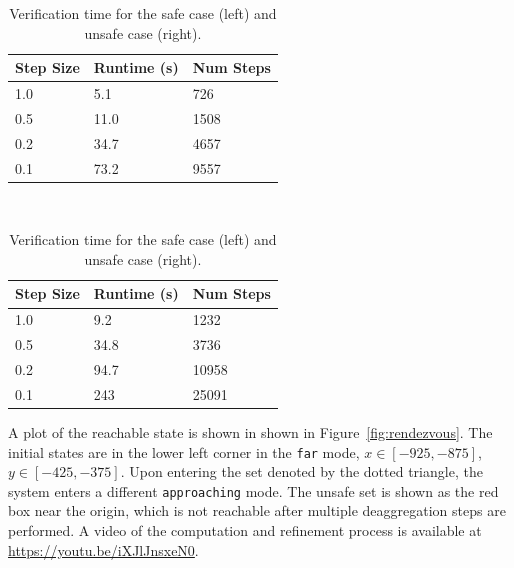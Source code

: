 \setlength{\tabcolsep}{2pt}
\begin{table}[t]
\caption{Verification time for the safe case (left) and unsafe case (right).}
\label{tab:runtime}
\centering
\setlength{\aboverulesep}{0.0pt}
\setlength{\belowrulesep}{0.0pt}
\setlength{\extrarowheight}{.0ex}
\begin{tabular}{@{}lll@{}}
  \toprule
  Step Size & Runtime (s) & Num Steps \\
  \midrule
  1.0 & 5.1 & 726 \\
  0.5 & 11.0 & 1508 \\
  0.2 & 34.7 & 4657 \\
  0.1 & 73.2 & 9557 \\
\bottomrule
\end{tabular}
~~~~~~~~
\begin{tabular}{@{}lll@{}}
  \toprule
  Step Size & Runtime (s) & Num Steps \\
  \midrule
  1.0 & 9.2 & 1232 \\
  0.5 & 34.8 & 3736 \\
  0.2 & 94.7 & 10958 \\
  0.1 & 243 & 25091 \\
\bottomrule
\end{tabular}
\end{table}

A plot of the reachable state is shown in shown in Figure~\ref{fig:rendezvous}.
%
The initial states are in the lower left corner in the \texttt{far} mode,
$x \in [-925, -875]$, $y \in [-425, -375]$.
%
Upon entering the set denoted by the dotted triangle,
the system enters a different \texttt{approaching} mode.
%
The unsafe set is shown as the red box near the origin, which is not reachable after multiple deaggregation steps are performed.
%
A video of the computation and refinement process is available at \url{https://youtu.be/iXJlJnsxeN0}.

